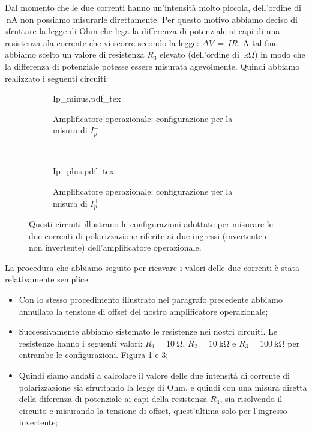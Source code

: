 Dal momento che le due correnti hanno un'intensità molto piccola, dell'ordine di $\SI{}{\nano\ampere}$ non possiamo misurarle direttamente. Per questo motivo abbiamo deciso di sfruttare la legge di Ohm che lega la differenza di potenziale ai capi di una resistenza ala corrente che vi scorre secondo la legge: $\Delta V\,=\,IR$. A tal fine abbiamo scelto un valore di resistenza $R_3$ elevato (dell'ordine di $\SI{}{\kilo\ohm}$) in modo che la differenza di potenziale potesse essere misurata agevolmente. Quindi abbiamo realizzato i seguenti circuiti:

\begin{figure}[H]
        \centering
        \begin{subfigure}[b]{0.48\textwidth}
        		\def\svgwidth{\textwidth}
                {Ip_minus.pdf_tex}
                \caption{Amplificatore operazionale: configurazione per la misura di $I_{p}^-$}
                \label{fig:ip_minus}
        \end{subfigure}
        ~
        \centering
        \begin{subfigure}[b]{0.48\textwidth}
        		\def\svgwidth{\textwidth}
                {Ip_plus.pdf_tex}
                \caption{Amplificatore operazionale: configurazione per la misura di $I_{p}^+$}
                \label{fig:ip_plus}
        \end{subfigure}
        \caption{Questi circuiti illustrano le configurazioni adottate per misurare le due correnti di polarizzazione riferite ai due ingressi (invertente e non invertente) dell'amplificatore operazionale.}
\end{figure}

La procedura che abbiamo seguito per ricavare i valori delle due correnti è stata relativamente semplice.
\begin{itemize}\itemsep2pt \parskip0pt 
	\item{Con lo stesso procedimento illustrato nel paragrafo precedente abbiamo annullato la tensione di offset del nostro amplificatore operazionale;}
	\item{Successivamente abbiamo sistemato le resistenze nei nostri circuiti. Le resistenze hanno i seguenti valori: $R_1=\SI{10}{\ohm}$, $R_2=\SI{10}{\kilo\ohm}$ e $R_3=\SI{100}{\kilo\ohm}$ per entrambe le configurazioni. Figura \ref{fig:ip_minus} e \ref{fig:ip_plus};}
	\item{Quindi siamo andati a calcolare il valore delle due intensità di corrente di polarizzazione sia sfruttando la legge di Ohm, e quindi con una misura diretta della diferenza di potenziale ai capi della resistenza $R_3$, sia risolvendo il circuito e misurando la tensione di offset, quest'ultima solo per l'ingresso invertente;}
\end{itemize}

